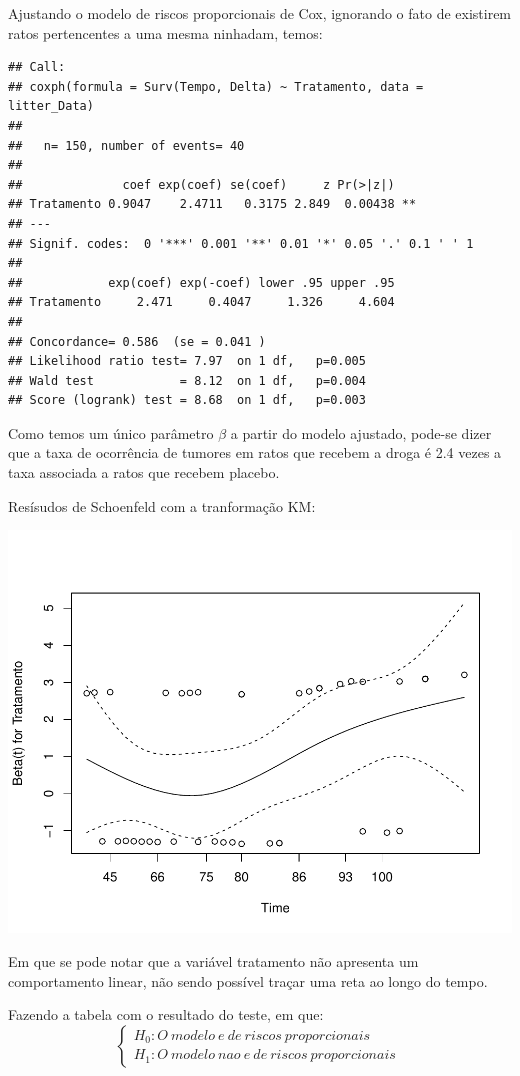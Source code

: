 \documentclass[]{article}
\begin{document}
Ajustando o modelo de riscos proporcionais de Cox, ignorando o fato de
existirem ratos pertencentes a uma mesma ninhadam, temos:

\begin{verbatim}
## Call:
## coxph(formula = Surv(Tempo, Delta) ~ Tratamento, data = litter_Data)
## 
##   n= 150, number of events= 40 
## 
##              coef exp(coef) se(coef)     z Pr(>|z|)   
## Tratamento 0.9047    2.4711   0.3175 2.849  0.00438 **
## ---
## Signif. codes:  0 '***' 0.001 '**' 0.01 '*' 0.05 '.' 0.1 ' ' 1
## 
##            exp(coef) exp(-coef) lower .95 upper .95
## Tratamento     2.471     0.4047     1.326     4.604
## 
## Concordance= 0.586  (se = 0.041 )
## Likelihood ratio test= 7.97  on 1 df,   p=0.005
## Wald test            = 8.12  on 1 df,   p=0.004
## Score (logrank) test = 8.68  on 1 df,   p=0.003
\end{verbatim}

Como temos um único parâmetro \(\beta\) a partir do modelo ajustado,
pode-se dizer que a taxa de ocorrência de tumores em ratos que recebem a
droga é 2.4 vezes a taxa associada a ratos que recebem placebo.

Resísudos de Schoenfeld com a tranformação KM:

\begin{center}\includegraphics[width=0.8\linewidth]{Lista_5_files/figure-latex/unnamed-chunk-13-1} \end{center}

Em que se pode notar que a variável tratamento não apresenta um
comportamento linear, não sendo possível traçar uma reta ao longo do
tempo.

Fazendo a tabela com o resultado do teste, em que:
\[ \left\{ \begin{array}{ll}
H_0: O \ modelo \ e \ de \ riscos \ proporcionais \\
H_1: O \ modelo \ nao \ e \ de \ riscos \ proporcionais  \end{array} \right.\ \]
\end{document}
